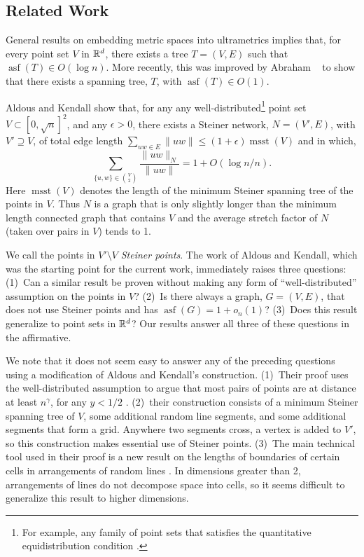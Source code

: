 \documentclass{patmorin}
\DeclareMathOperator{\asf}{asf}
\DeclareMathOperator{\msst}{msst}
\begin{document}
\subsection{Related Work}

General results on embedding metric spaces into ultrametrics
\cite{bartal:graph,fakcharoenphol.rao.ea:tight} implies that, for
every point set $V$ in $\mathbb{R}^d$, there exists a tree $T=(V,E)$ such that
$\asf(T)\in O(\log n)$.  More recently, this was improved by Abraham
\etal\ \cite{abraham.bartal.ea:metric,abraham.bartal.ea:embedding}
to show that there exists a spanning tree, $T$, with $\asf(T)\in O(1)$.

Aldous and Kendall \cite{aldous.kendall:short-length} show that,
for any any well-distributed\footnote{For example, any family
of point sets that satisfies the quantitative equidistribution
condition \cite[Definition~3]{aldous.kendall:short-length}.} point set
$V\subset[0,\sqrt{n}]^2$, and any $\epsilon > 0$, there exists a
Steiner network, $N=(V',E)$, with $V'\supseteq V$, of total edge length
$\sum_{uw\in E}\|uw\| \le (1+\epsilon)\msst(V)$ and in which,
\[
    \sum_{\{u,w\}\in \binom{V}{2}}\frac{\|uw\|_N}{\|uw\|} = 1 + O(\log n/n) .
\]
Here $\msst(V)$ denotes the length of the minimum Steiner spanning tree
of the points in $V$.  Thus $N$ is a graph that is only slightly longer
than the minimum length connected graph that contains $V$ and the average
stretch factor of $N$ (taken over pairs in $V$) tends to 1.

We call the points in $V'\setminus V$ \emph{Steiner points}.  The work of
Aldous and Kendall, which was the starting point for the current work,
immediately raises three questions: (1)~Can a similar result be proven
without making any form of ``well-distributed'' assumption on the points
in $V$? (2)~Is there always a graph, $G=(V,E)$, that does not use Steiner
points and has $\asf(G)=1+o_n(1)$? (3)~Does this result generalize to
point sets in $\mathbb{R}^d$?  Our results answer all three of these questions
in the affirmative.

We note that it does not seem easy to answer any of the preceding
questions using a modification of Aldous and Kendall's construction.
(1)~Their proof uses the well-distributed assumption to argue that
most pairs of points are at distance at least $n^{\gamma}$, for any
$y<1/2$ \cite[Section~5.3]{aldous.kendall:short-length}.  (2)~their
construction consists of a minimum Steiner spanning tree of $V$,
some additional random line segments, and some additional segments
that form a grid.  Anywhere two segments cross, a vertex is added
to $V'$, so this construction makes essential use of Steiner points.
(3)~The main technical tool used in their proof is a new result on the
lengths of boundaries of certain cells in arrangements of random lines
\cite[Theorems~3 and 4]{aldous.kendall:short-length}.  In dimensions
greater than 2, arrangements of lines do not decompose space into cells,
so it seems difficult to generalize this result to higher dimensions.
\end{document}
